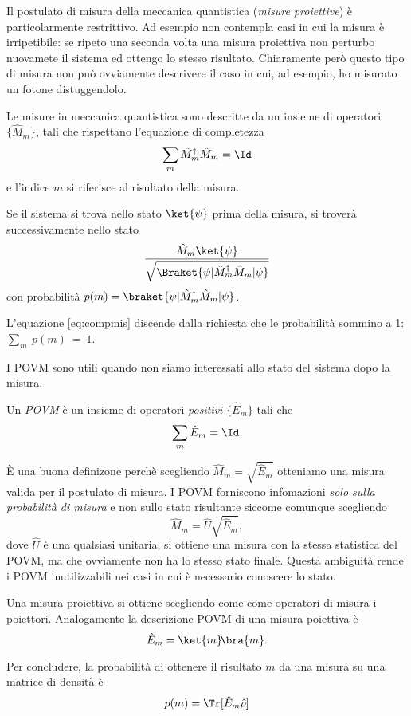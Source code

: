 \documentclass[a4]{article}
\begin{document}
Il postulato di misura della meccanica quantistica (\emph{misure proiettive}) è particolarmente
restrittivo. Ad esempio non contempla casi in cui la misura è irripetibile: se ripeto una
seconda volta una misura proiettiva non perturbo nuovamete il sistema ed ottengo lo stesso
risultato. Chiaramente però questo tipo di misura non può ovviamente descrivere il caso in
cui, ad esempio, ho misurato un fotone distuggendolo.
\begin{post}[di misura]
Le misure in meccanica quantistica sono descritte da un insieme di operatori
\(\{\hat{M}_m\}\), tali che rispettano l'equazione di completezza
\begin{equation} \label{eq:compmis}
\sum_m \hat{M}^\dag_m \hat{M}_m = \Id
\end{equation}
e l'indice \(m\) si riferisce al risultato della misura.

Se il sistema si trova nello stato \(\ket{\psi}\) prima della misura, si troverà successivamente
nello stato
\[ \frac{\hat{M}_m \ket{\psi}}{\sqrt{\Braket{\psi|\hat{M}^\dag_m \hat{M}_m|\psi}}}\]
con probabilità \(p(m)= \braket{\psi|\hat{M}^\dag_m \hat{M}_m|\psi}\).
\end{post}
L'equazione \eqref{eq:compmis} discende dalla richiesta che le probabilità sommino a 1:
\(\sum_m~p(m)~=~1\).

I POVM sono utili quando non siamo interessati allo stato del sistema dopo la misura.
\begin{defn}[POVM]
Un \emph{POVM} è un insieme di operatori \emph{positivi} \(\{\hat{E}_m\}\) tali che
\[\sum_m \hat{E}_m  = \Id.\]
\end{defn}
È una buona definizone perchè scegliendo \(\hat{M}_m = \sqrt{\hat{E}_m}\) otteniamo una
misura valida per il postulato di misura. I POVM forniscono infomazioni \emph{solo sulla
probabilità di misura} e non sullo stato risultante siccome comunque scegliendo
\[\hat{M}_m = \hat{U}\sqrt{\hat{E}_m},\]
dove \(\hat{U}\) è una qualsiasi unitaria, si ottiene una misura con la stessa statistica
del POVM, ma che ovviamente non ha lo stesso stato finale. Questa ambiguità
rende i POVM inutilizzabili nei casi in cui è necessario conoscere lo stato.

Una misura proiettiva si ottiene scegliendo come come operatori di misura
i poiettori. Analogamente la descrizione POVM di una misura poiettiva è
\[\hat{E}_m = \ket{m}\!\bra{m}.\]

Per concludere, la probabilità di ottenere il risultato \(m\) da una misura su
una matrice di densità è
\[p(m) = \Tr[\hat{E}_m \hat{\rho}]\]
\end{document}
